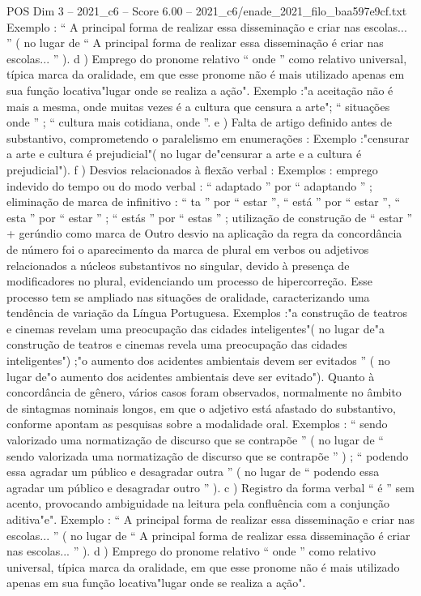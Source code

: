 \begin{textsample}{POS Dim 3 – 2021\_c6 – Score 6.00 – 2021\_c6/enade\_2021\_filo\_baa597e9cf.txt}
Exemplo : “ A principal forma de realizar essa disseminação e criar nas escolas... ” ( no lugar de “ A principal forma de realizar essa disseminação é criar nas escolas... ” ). d ) Emprego do pronome relativo “ onde ” como relativo universal, típica marca da oralidade, em que esse pronome não é mais utilizado apenas em sua função locativa"lugar onde se realiza a ação".
Exemplo :"a aceitação não é mais a mesma, onde muitas vezes é a cultura que censura a arte"; “ situações onde ” ; “ cultura mais cotidiana, onde ”. e ) Falta de artigo definido antes de substantivo, comprometendo o paralelismo em enumerações : Exemplo :"censurar a arte e cultura é prejudicial"( no lugar de"censurar a arte e a cultura é prejudicial"). f ) Desvios relacionados à flexão verbal : Exemplos : emprego indevido do tempo ou do modo verbal : “ adaptado ” por “ adaptando ” ; eliminação de marca de infinitivo : “ ta ” por “ estar ”, “ está ” por “ estar ”, “ esta ” por “ estar ” ; “ estás ” por “ estas ” ; utilização de construção de “ estar ” + gerúndio como marca de Outro desvio na aplicação da regra da concordância de número foi o aparecimento da marca de plural em verbos ou adjetivos relacionados a núcleos substantivos no singular, devido à presença de modificadores no plural, evidenciando um processo de hipercorreção.
Esse processo tem se ampliado nas situações de oralidade, caracterizando uma tendência de variação da Língua Portuguesa.
Exemplos :"a construção de teatros e cinemas revelam uma preocupação das cidades inteligentes"( no lugar de"a construção de teatros e cinemas revela uma preocupação das cidades inteligentes") ;"o aumento dos acidentes ambientais devem ser evitados ” ( no lugar de"o aumento dos acidentes ambientais deve ser evitado").
Quanto à concordância de gênero, vários casos foram observados, normalmente no âmbito de sintagmas nominais longos, em que o adjetivo está afastado do substantivo, conforme apontam as pesquisas sobre a modalidade oral.
Exemplos : “ sendo valorizado uma normatização de discurso que se contrapõe ” ( no lugar de “ sendo valorizada uma normatização de discurso que se contrapõe ” ) ; “ podendo essa agradar um público e desagradar outra ” ( no lugar de “ podendo essa agradar um público e desagradar outro ” ). c ) Registro da forma verbal “ é ” sem acento, provocando ambiguidade na leitura pela confluência com a conjunção aditiva"e".
Exemplo : “ A principal forma de realizar essa disseminação e criar nas escolas... ” ( no lugar de “ A principal forma de realizar essa disseminação é criar nas escolas... ” ). d ) Emprego do pronome relativo “ onde ” como relativo universal, típica marca da oralidade, em que esse pronome não é mais utilizado apenas em sua função locativa"lugar onde se realiza a ação".

\end{textsample}
